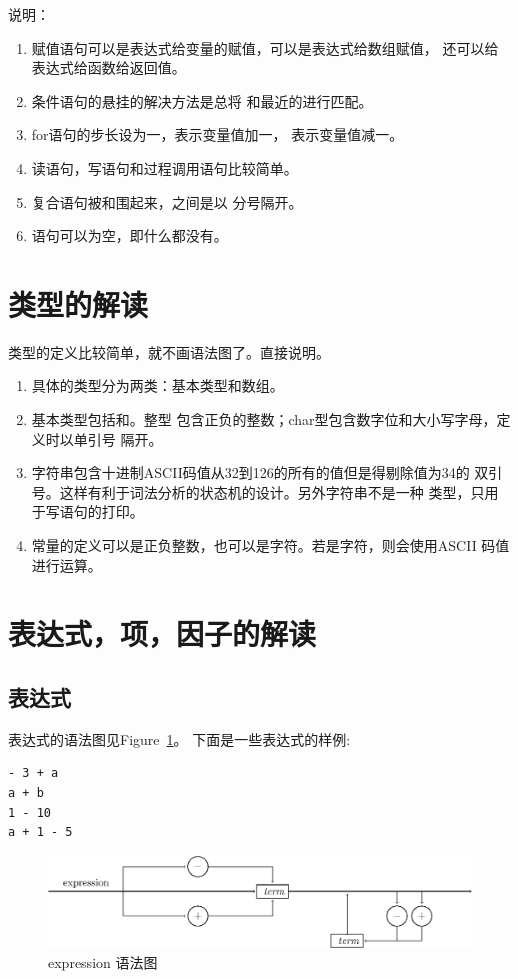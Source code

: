 说明：
\begin{enumerate}
	\item 赋值语句可以是表达式给变量的赋值，可以是表达式给数组赋值，
		还可以给表达式给函数给返回值。
	\item 条件语句的悬挂的解决方法是总将
		和最近的进行匹配。
	\item for语句的步长设为一，表示变量值加一，
		表示变量值减一。
	\item 读语句，写语句和过程调用语句比较简单。
	\item 复合语句被和围起来，之间是以
		分号隔开。
	\item 语句可以为空，即什么都没有。
\end{enumerate}
\section{类型的解读}








类型的定义比较简单，就不画语法图了。直接说明。
\begin{enumerate}
	\item 具体的类型分为两类：基本类型和数组。
	\item 基本类型包括和。整型
		包含正负的整数；char型包含数字位和大小写字母，定义时以单引号
		隔开。
	\item 字符串包含十进制ASCII码值从32到126的所有的值但是得剔除值为34的
		双引号。这样有利于词法分析的状态机的设计。另外字符串不是一种
		类型，只用于写语句的打印。
	\item 常量的定义可以是正负整数，也可以是字符。若是字符，则会使用ASCII
		码值进行运算。
\end{enumerate}
\section{表达式，项，因子的解读}
\subsection{表达式}

表达式的语法图见Figure~\ref{expression}。
下面是一些表达式的样例:
\begin{verbatim}
- 3 + a
a + b
1 - 10
a + 1 - 5
\end{verbatim}
\begin{figure}[h!]
\begin{center}
    \includegraphics[scale=.8]{Figures/expression.eps}
\end{center}
\caption{expression 语法图}
\label{expression}
\end{figure}
